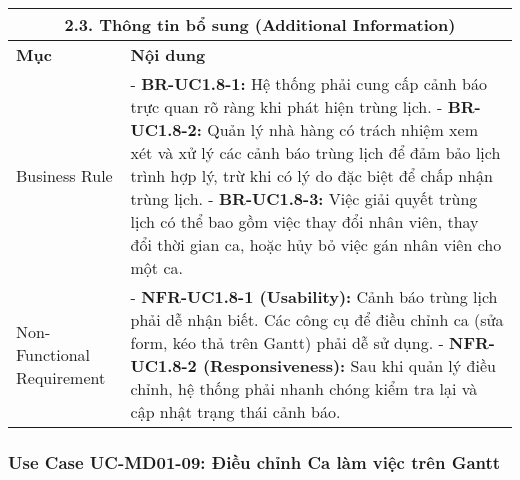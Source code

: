 \begin{longtable}{|m{4cm}|p{11cm}|}
\hline
\multicolumn{2}{|c|}{\textbf{2.3. Thông tin bổ sung (Additional Information)}} \\
\hline
\textbf{Mục} & \textbf{Nội dung} \\
\hline
Business Rule & - \textbf{BR-UC1.8-1:} Hệ thống phải cung cấp cảnh báo trực quan rõ ràng khi phát hiện trùng lịch. \newline - \textbf{BR-UC1.8-2:} Quản lý nhà hàng có trách nhiệm xem xét và xử lý các cảnh báo trùng lịch để đảm bảo lịch trình hợp lý, trừ khi có lý do đặc biệt để chấp nhận trùng lịch. \newline - \textbf{BR-UC1.8-3:} Việc giải quyết trùng lịch có thể bao gồm việc thay đổi nhân viên, thay đổi thời gian ca, hoặc hủy bỏ việc gán nhân viên cho một ca. \\
\hline
Non-Functional Requirement & - \textbf{NFR-UC1.8-1 (Usability):} Cảnh báo trùng lịch phải dễ nhận biết. Các công cụ để điều chỉnh ca (sửa form, kéo thả trên Gantt) phải dễ sử dụng. \newline - \textbf{NFR-UC1.8-2 (Responsiveness):} Sau khi quản lý điều chỉnh, hệ thống phải nhanh chóng kiểm tra lại và cập nhật trạng thái cảnh báo. \\
\hline
\end{longtable}

\subsubsection{Use Case UC-MD01-09: Điều chỉnh Ca làm việc trên Gantt}

